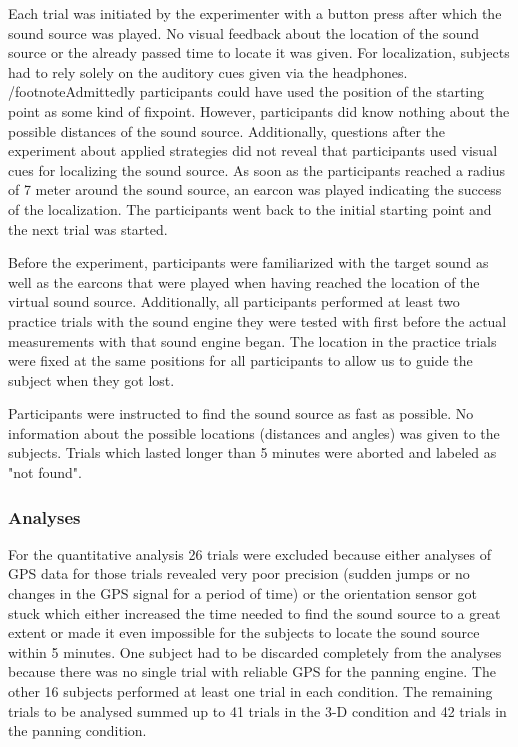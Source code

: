 \documentclass[journal]{IEEEtran}
\begin{document}
Each trial was initiated by the experimenter with a button press after which the sound source was played. No visual feedback about the location of the sound source or the already passed time to locate it was given. For localization, subjects had to rely solely on the auditory cues given via the headphones. /footnote{Admittedly participants could have used the position of the starting point as some kind of fixpoint. However, participants did know nothing about the possible distances of the sound source. Additionally, questions after the experiment about applied strategies did not reveal that participants used visual cues for localizing the sound source.} As soon as the participants reached a radius of 7 meter around the sound source, an earcon was played indicating the success of the localization. The participants went back to the initial starting point and the next trial was started.

Before the experiment, participants were familiarized with the target sound as well as the earcons that were played when having reached the location of the virtual sound source. Additionally, all participants performed at least two practice trials with the sound engine they were tested with first before the actual measurements with that sound engine began. The location in the practice trials were fixed at the same positions for all participants to allow us to guide the subject when they got lost. 

Participants were instructed to find the sound source as fast as possible. No information about the possible locations (distances and angles) was given to the subjects. Trials which lasted longer than 5 minutes were aborted and labeled as "not found". 

\subsubsection{Analyses}
For the quantitative analysis 26 trials were excluded because either analyses of GPS data for those trials revealed very poor precision (sudden jumps or no changes in the GPS signal for a period of time) or the orientation sensor got stuck which either increased the time needed to find the sound source to a great extent or made it even impossible for the subjects to locate the sound source within 5 minutes. One subject had to be discarded completely from the analyses because there was no single trial with reliable GPS for the panning engine. The other 16 subjects performed at least one trial in each condition. The remaining trials to be analysed summed up to 41 trials in the 3-D condition and 42 trials in the panning condition.
\end{document}
